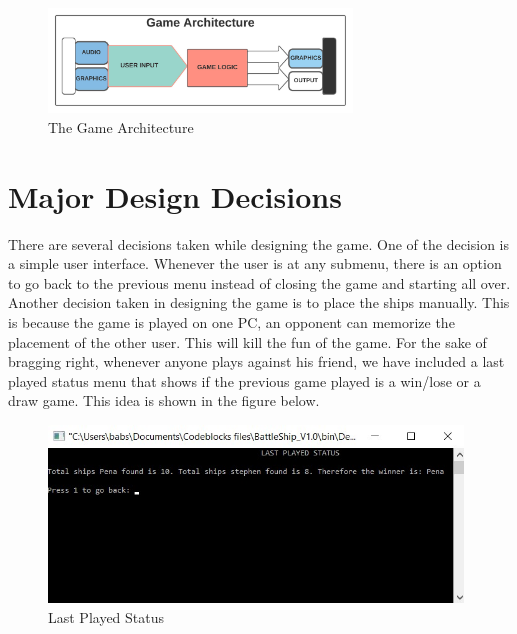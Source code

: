 \documentclass[12pt]{article}
\begin{document}
\begin{figure}[h]
    \centering
    \includegraphics[width=0.72\textwidth]{HEL_template/figures/gameart.jpeg}
    \caption{The Game Architecture}
    \label{game architecture}
\end{figure}

\section{Major Design Decisions}
There are several decisions taken while designing the game. One of the decision is a simple user interface. Whenever the user is at any submenu, there is an option to go back to the previous menu instead of closing the game and starting all over. Another decision taken in designing the game is to place the ships manually. This is because the game is played on one PC, an opponent can memorize the placement of the other user. This will kill the fun of the game. For the sake of bragging right, whenever anyone plays against his friend, we have included a last played status menu that shows if the previous game played is a win/lose or a draw game. This idea is shown in the figure below.

\begin{figure}[h]
    \centering
    \includegraphics[width=0.98\textwidth]{HEL_template/figures/gameplaystatus.jpg}
    \caption{Last Played Status}
    \label{gamestatus}
\end{figure}
\end{document}
